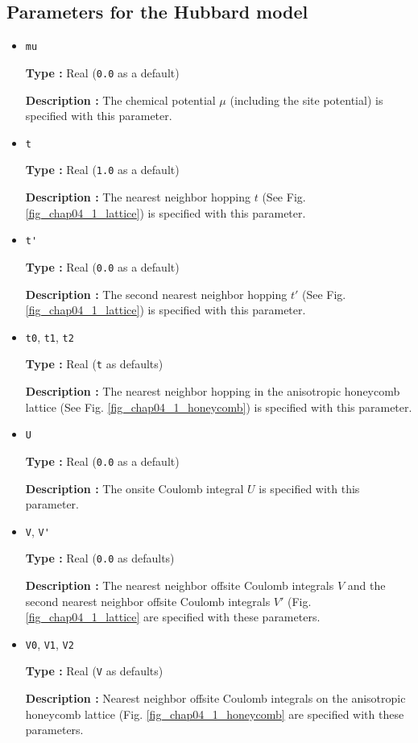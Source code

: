 \subsection{Parameters for the Hubbard model}
\begin{itemize}
\item \verb|mu|

{\bf Type :} Real (\verb|0.0| as a default)

{\bf Description :} The chemical potential $\mu$ (including the site potential)
is specified with this parameter.

\item \verb|t|

{\bf Type :} Real (\verb|1.0| as a default)

{\bf Description :} The nearest neighbor hopping $t$ (See Fig. \ref{fig_chap04_1_lattice})
is specified with this parameter.

\item \verb|t'|

{\bf Type :} Real (\verb|0.0| as a default)

{\bf Description :} The second nearest neighbor hopping $t'$ (See Fig. \ref{fig_chap04_1_lattice})
is specified with this parameter.

\item \verb|t0|, \verb|t1|, \verb|t2|

{\bf Type :} Real (\verb|t| as defaults)

{\bf Description :} The nearest neighbor hopping 
in the anisotropic honeycomb lattice 
(See Fig. \ref{fig_chap04_1_honeycomb})
is specified with this parameter.

\item \verb|U|

{\bf Type :} Real (\verb|0.0| as a default)

{\bf Description :} The onsite Coulomb integral $U$ is specified with this parameter.

\item \verb|V|, \verb|V'|

{\bf Type :} Real (\verb|0.0| as defaults)

{\bf Description :} The nearest neighbor offsite Coulomb integrals $V$
and the second nearest neighbor offsite Coulomb integrals $V'$
(Fig. \ref{fig_chap04_1_lattice} are specified with these parameters.

\item \verb|V0|, \verb|V1|, \verb|V2|

{\bf Type :} Real (\verb|V| as defaults)

{\bf Description :} Nearest neighbor offsite Coulomb integrals 
on the anisotropic honeycomb lattice
(Fig. \ref{fig_chap04_1_honeycomb} are specified with these parameters.

\end{itemize}


